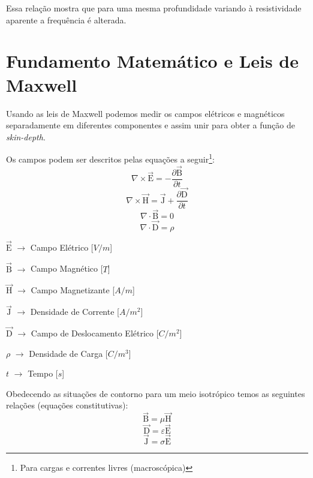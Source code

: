 	Essa relação mostra que para uma mesma profundidade variando à resistividade
	aparente a frequência é alterada.


    \section{Fundamento Matemático e Leis de Maxwell}
	\label{mat_maxwell}

	Usando as leis de Maxwell \cite{eletromag8hayt} podemos medir os campos elétricos
	e magnéticos separadamente em diferentes componentes e assim unir para obter a 
	função de \textit{skin-depth}.
	
	Os campos podem ser descritos pelas equações a seguir\footnote{Para cargas e correntes livres
	(macroscópica)}:
	    \begin{equation}
		\label{rot_elet_max}
		\nabla \times \vec{\textrm{E}}=-\frac{\partial \vec{\textrm{B}}}{\partial t} 
	    \end{equation}
	    \begin{equation}
		\label{rot_mag_max}
 		\nabla \times \vec{\textrm{H}} = \vec{\textrm{J}} + \frac{\partial \vec{\textrm{D}}}{\partial t}
	    \end{equation}
	    \begin{equation}
 		\nabla \cdot \vec{\textrm{B}} = 0
	    \end{equation}
	    \begin{equation}
 		\nabla \cdot \vec{\textrm{D}} = \rho
	    \end{equation}

	    $\vec{\textrm{E}}$ $\rightarrow$ Campo Elétrico [$V/m$]
	    
	    $\vec{\textrm{B}}$ $\rightarrow$ Campo Magnético [$T$]
	    
	    $\vec{\textrm{H}}$ $\rightarrow$ Campo Magnetizante [$A/m$]
	    
	    $\vec{\textrm{J}}$ $\rightarrow$ Densidade de Corrente [$A/m^2$]
	    
	    $\vec{\textrm{D}}$ $\rightarrow$ Campo de Deslocamento Elétrico [$C/m^2$]
	    
	    $\rho$ $\rightarrow$ Densidade de Carga [$C/m^3$]
	    
	    $t$ $\rightarrow$ Tempo [$s$]

	    Obedecendo as situações de contorno para um meio isotrópico temos as seguintes
	    relações (equações constitutivas):
	    \begin{equation}
	      \label{con_B}
	      \vec{\textrm{B}} = \mu \vec{\textrm{H}}
	    \end{equation}
	    \begin{equation}
	      \label{con_D}
	      \vec{\textrm{D}} = \varepsilon  \vec{\textrm{E}}
	    \end{equation}
	    \begin{equation}
	      \label{con_J}
	      \vec{\textrm{J}} = \sigma \vec{\textrm{E}}
	    \end{equation}
	    
